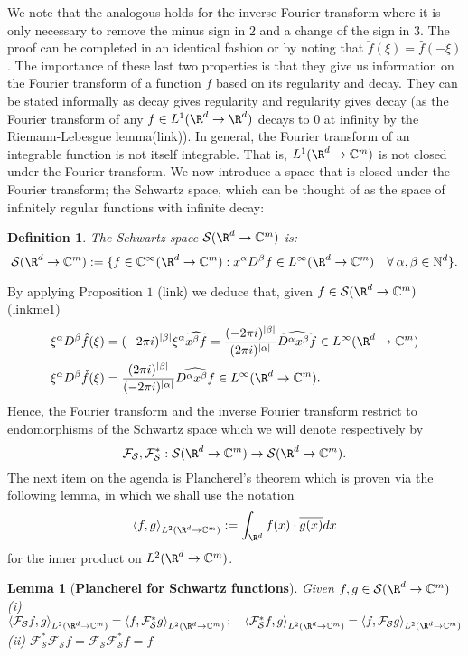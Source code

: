 \documentclass[12pt]{article}
\newtheorem{lemma}{Lemma}
\newtheorem{definition}{Definition}
\newcommand{\br}[1]{\left\langle#1\right\rangle}
\begin{document}
We note that the analogous holds for the inverse Fourier transform where it is only necessary to remove the minus sign in $2$ and a change of the sign in $3$. The proof can be completed
in an identical fashion or by noting that $\check{f}(\xi )=\hat{f}(-\xi )$.
\bigbreak
The importance of these last two properties is that they give us information on the Fourier transform of a function $f$ based on its regularity and decay. They can be stated informally as decay gives regularity and regularity gives decay (as the Fourier transform of any $f\in L^1(\R^d\to\R^d)$ decays to 0 at infinity by the Riemann-Lebesgue lemma(link)).\bigbreak
In general, the Fourier transform of an integrable function is not itself integrable. That is, $L^1(\R^d\to\C^m)$ is not closed under the Fourier transform. We now introduce a space that is closed under the Fourier transform; the Schwartz space, which can be thought of as the space of infinitely regular functions with infinite decay: \bigbreak
\begin{definition}\label{Schwartz space definition}
	The \emph{Schwartz space} $\mathcal{S}(\R^d\to\C^m)$ is:
	\[\mathcal{S}(\R^d\to\C^m):=\lbrace f\in\C^\infty(\R^d\to\C^m):x^\alpha D^\beta f\in L^\infty(\R^d\to\C^m)\quad\forall\hspace{2pt}\alpha,\beta\in \N^d\rbrace.\]
\end{definition}
By applying Proposition $1$ (link) we deduce that, given $f\in\mathcal{S}(\R^d\to\C^m)$ (linkme1)
\begin{align*}\label{rdft}
	\xi^\alpha D^\beta \hat{f}(\xi)   & =(-2\pi i)^{\abs{\beta}}\xi^{\alpha}\widehat{x^{\beta}f}=\frac{(-2\pi i)^{\abs{\beta}}}{(2\pi i)^{\abs{\alpha}}}\widehat{D^{\alpha}x^{\beta}f}\in L^\infty(\R^d\to\C^m) \\
	\xi^\alpha D^\beta \check{f}(\xi) & =\frac{(2\pi i)^{\abs{\beta}}}{(-2\pi i)^{\abs{\alpha}}}\widehat{D^{\alpha}x^{\beta}f}\in L^\infty(\R^d\to\C^m).
\end{align*}
Hence, the Fourier transform and the inverse Fourier transform restrict to endomorphisms of the Schwartz space which we will denote respectively by
\[\mathcal{F}_\mathcal{S},\mathcal{F}^*_\mathcal{S}:\mathcal{S}(\R^d\to\C^m)\to\mathcal{S}(\R^d\to\C^m).\]
The next item on the agenda is Plancherel's theorem which is proven via the following lemma, in which we shall use the notation\[\br{f,g}_{L^2(\R^d\to\C^m)}:=\int_{\R^d}f(x)\cdot  \overline{g(x)} dx\] for the inner product on $L^2(\R^d\to\C^m)$.
\begin{lemma}[\textbf{Plancherel for Schwartz functions}]\label{Planncherellemma}
	Given $f,g\in \mathcal{S}(\R^d\to\C^m)$ \bigbreak
	(i) $\br{\mathcal{F}_\mathcal{S}f,g}_{L^2(\R^d\to\C^m)}=\br{f,\mathcal{F}_\mathcal{S}^*g}_{L^2(\R^d\to\C^m)};\quad\br{\mathcal{F}_\mathcal{S}^*f,g}_{L^2(\R^d\to\C^m)}=\br{f,\mathcal{F}_\mathcal{S}g}_{L^2(\R^d\to\C^m)}$
	\bigbreak
	(ii) $\mathcal{F}_\mathcal{S}^*\mathcal{F}_\mathcal{S}f=\mathcal{F}_\mathcal{S}\mathcal{F}_\mathcal{S}^*f=f$
\end{lemma}
\end{document}
